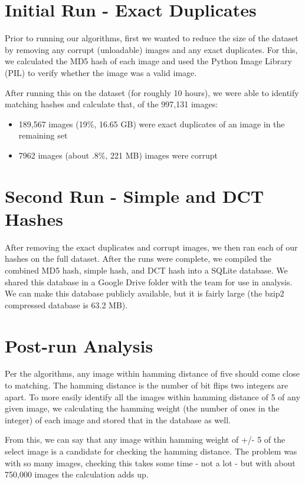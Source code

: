 \documentclass[11pt,a4paper,titlepage]{article}
\begin{document}
\section{Initial Run - Exact Duplicates}

Prior to running our algorithms, first we wanted to reduce the size of the
dataset by removing any corrupt (unloadable) images and any exact duplicates.
For this, we calculated the MD5 hash of each image and used the Python Image
Library (PIL) to verify whether the image was a valid image.

After running this on the dataset (for roughly 10 hours), we were able to
identify matching hashes and calculate that, of the 997,131 images:

\begin{itemize}
    \item
        189,567 images (19\%, 16.65 GB)  were exact duplicates of an image in the remaining set
    \item
        7962 images (about .8\%, 221 MB) images were corrupt
\end{itemize}


\section{Second Run - Simple and DCT Hashes}

After removing the exact duplicates and corrupt images, we then ran each of our
hashes on the full dataset.  After the runs were complete, we compiled the
combined MD5 hash, simple hash, and DCT hash into a SQLite database.  We shared
this database in a Google Drive folder with the team for use in analysis.  We
can make this database publicly available, but it is fairly large (the bzip2
compressed database is 63.2 MB).

\section{Post-run Analysis}

Per the algorithms, any image within hamming distance of five should come close
to matching.  The hamming distance is the number of bit flips two integers are
apart.  To more easily identify all the images within hamming distance of 5 of
any given image, we calculating the hamming weight (the number of ones in the
integer) of each image and stored that in the database as well.

From this, we can say that any image within hamming weight of +/- 5 of the
select image is a candidate for checking the hamming distance.  The problem was
with so many images, checking this takes some time - not a lot - but with about
750,000 images the calculation adds up.
\end{document}
